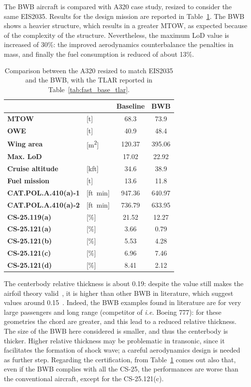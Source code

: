 The BWB aircraft is compared with A320 case study, resized to consider the same EIS2035. 
Results for the design mission are reported in Table~\ref{tab:bwb_conv_results}. 
The BWB shows a heavier structure, which results in a greater MTOW, as expected because of the complexity of the structure. 
Nevertheless, the maximum LoD value is increased of 30\%: the improved aerodynamics counterbalance the penalties in mass, and finally the fuel consumption is reduced of about 13\%. 
\begin{table}[!h]
	\centering
	\begin{tabular}{l l c c}
		\cline{3-4}
		& & \textbf{Baseline} & \textbf{BWB} \\
		\hline
		\textbf{MTOW} & [\si{\tonne}] & 68.3 & 73.9 \\
		\textbf{OWE} & [\si{\tonne}] & 40.9 & 48.4 \\
		\textbf{Wing area} & [\si{\square\meter}] & 120.37 & 395.06 \\
		\textbf{Max. LoD} & & 17.02 & 22.92 \\
		\textbf{Cruise altitude} & [kft] & 34.6 & 38.9 \\
		\textbf{Fuel mission} & [\si{\tonne}] & 13.6 & 11.8 \\
		\hline
		\textbf{CAT.POL.A.410(a)-1} & [ft\si{\per\minute}] & 947.36 & 640.97 \\
		\textbf{CAT.POL.A.410(a)-2} & [ft\si{\per\minute}] & 736.79 & 633.95 \\
		\textbf{CS-25.119(a)} & [\%] & 21.52 & 12.27 \\
		\textbf{CS-25.121(a)} & [\%] & 3.66 & 0.79 \\
		\textbf{CS-25.121(b)} & [\%] & 5.53 & 4.28 \\
		\textbf{CS-25.121(c)} & [\%] & 6.96 & 7.46 \\
		\textbf{CS-25.121(d)} & [\%] & 8.41 & 2.12 \\
		\hline		
	\end{tabular}
	\caption{Comparison between the A320 resized to match EIS2035 and the BWB, with the TLAR reported in Table~\ref{tab:fast_base_tlar}.}
	\label{tab:bwb_conv_results}
\end{table}
The centerbody relative thickness is about 0.19: despite the value still makes the airfoil theory valid~\cite{bib:abbott}, it is higher than other BWB in literature, which suggest values around 0.15~\cite{bib:van_dommelen, bib:bwb_n3_vol1}. 
Indeed, the BWB examples found in literature are for very large passengers and long range (competitor of \textit{i.e.} Boeing 777): for these geometries the chord are greater, and this lead to a reduced relative thickness. 
The size of the BWB here considered is smaller, and thus the centerbody is thicker. 
Higher relative thickness may be problematic in transonic, since it facilitates the formation of shock wave; a careful aerodynamics design is needed as further step. 
Regarding the certification, from Table~\ref{tab:bwb_conv_results} comes out also that, even if the BWB complies with all the CS-25, the performances are worse than the conventional aircraft, except for the CS-25.121(c). 

